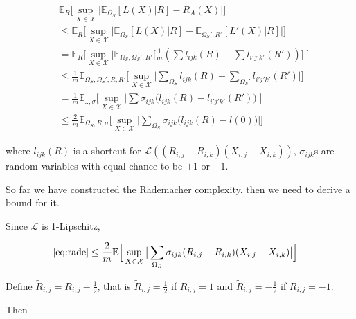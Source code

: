 \documentclass[conference]{IEEEtran}
\numberwithin{equation}{section}
\newcommand{\supX}{\sup_{X \in \mathcal{X}}}
\newcommand{\E}{\mathbb{E}}
\newtheorem{sampling strategy}{Sampling Strategy}
\begin{document}
\begin{subequations}
\begin{align}
    & \mathbb{E}_R \Big[ \sup_{X \in \mathcal{X}} \big|\mathbb{E}_{\Omega_S} [L(X) | R] - R_A(X) \big| \Big] \\
    & \leq \E_R  \Big[ \sup_{X \in \mathcal{X}} \big|\mathbb{E}_{\Omega_S} [L(X) | R] - \E_{\Omega_S', R'} [L'(X) | R] \big| \Big] \nonumber \\
    & = \E_R \Big[ \supX \big| \E_{\Omega_S, \Omega_S', R'} \big[ \frac{1}{m}( \sum l_{ijk}(R) - \sum l_{i'j'k'}(R') ) \big] \big| \Big] \nonumber \\
    & \leq \frac{1}{m} \E_{\Omega_S, \Omega_S', R, R'} \Big[ \supX \big| \sum_{ \Omega_S} l_{ijk}(R) - \sum_{ \Omega_S'} l_{i'j'k'}(R')  \big| \Big] \nonumber \\
    & = \frac{1}{m} \E_{.., \sigma} \Big[ \supX \big| \sum \sigma_{ijk} \big( l_{ijk}(R) - l_{i'j'k'}(R') \big) \big| \Big] \nonumber \\
    & \leq \frac{2}{m} \E_{\Omega_S, R, \sigma} \Big[ \supX \big| \sum_{\Omega_S} \sigma_{ijk} \big( l_{ijk}(R) - l(0) \big)  \big| \Big]  \label{eq:rade} 
\end{align}
\end{subequations}

where $l_{ijk}(R)$ is a shortcut for $\mathcal{L}((R_{i,j} - R_{i,k})(X_{i,j} - X_{i,k}))$, $\sigma_{ijk}$s are random variables with equal chance to be $+1$ or $-1$. 

So far we have constructed the Rademacher complexity. then we need to derive a bound for it.

Since $\mathcal{L}$ is 1-Lipschitz,

\begin{subequations}
\begin{align}
    \ref{eq:rade} & \leq \frac{2}{m} \E \Big[ \supX \big| \sum_{\Omega_S} \sigma_{ijk} (R_{i,j} - R_{i,k})(X_{i,j} - X_{i,k}) \big| \Big] \label{eq:lip}
\end{align}
\end{subequations}

Define $\tilde{R}_{i,j} = R_{i,j} - \frac{1}{2}$, that is $\tilde{R}_{i,j} = \frac{1}{2}$ if $R_{i,j} = 1$ and $\tilde{R}_{i,j} = -\frac{1}{2}$ if $R_{i,j} = -1$.

Then
\end{document}

